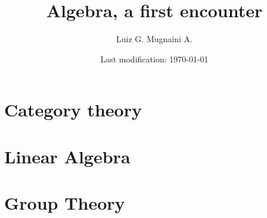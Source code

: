 

\title{Algebra, a first encounter}
\author{Luiz G. Mugnaini A.}
\date{Last modification: \today}


\maketitle
\tableofcontents
\listoftodos

\part{Category theory}



\part{Linear Algebra}



\part{Group Theory}




